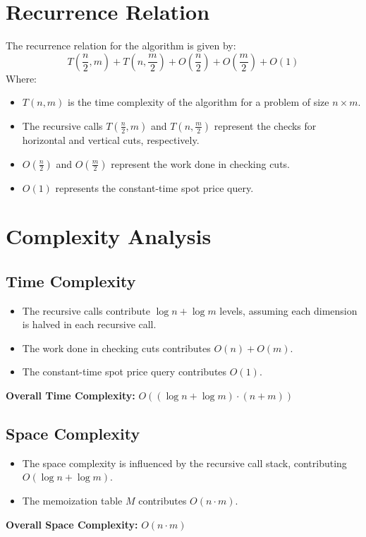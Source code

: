 \documentclass{article}
\begin{document}
\section{Recurrence Relation}
The recurrence relation for the algorithm is given by:
\[
T\left(\frac{n}{2}, m\right) + T\left(n, \frac{m}{2}\right) + O\left(\frac{n}{2}\right) + O\left(\frac{m}{2}\right) + O(1)
\]
Where:
\begin{itemize}
    \item $T(n, m)$ is the time complexity of the algorithm for a problem of size $n \times m$.
    \item The recursive calls $T\left(\frac{n}{2}, m\right)$ and $T\left(n, \frac{m}{2}\right)$ represent the checks for horizontal and vertical cuts, respectively.
    \item $O\left(\frac{n}{2}\right)$ and $O\left(\frac{m}{2}\right)$ represent the work done in checking cuts.
    \item $O(1)$ represents the constant-time spot price query.
\end{itemize}

\section{Complexity Analysis}

\subsection{Time Complexity}
\begin{itemize}
    \item The recursive calls contribute $\log n + \log m$ levels, assuming each dimension is halved in each recursive call.
    \item The work done in checking cuts contributes $O(n) + O(m)$.
    \item The constant-time spot price query contributes $O(1)$.
\end{itemize}
\textbf{Overall Time Complexity:} $O((\log n + \log m) \cdot (n + m))$

\subsection{Space Complexity}
\begin{itemize}
    \item The space complexity is influenced by the recursive call stack, contributing $O(\log n + \log m)$.
    \item The memoization table $M$ contributes $O(n \cdot m)$.
\end{itemize}
\textbf{Overall Space Complexity:} $O(n \cdot m)$
\end{document}
